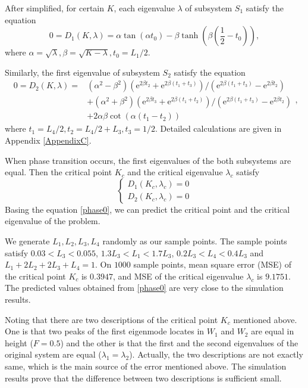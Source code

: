 \documentclass[a4paper,11pt]{article}
\begin{document}
After simplified, for certain $K$, each eigenvalue $\lambda$ of subsystem $S_1$ satisfy the equation
\begin{equation}\label{phase1}
0 = D_1(K, \lambda) = \alpha \tan(\alpha t_0) - \beta \tanh(\beta (\frac12 - t_0)),
\end{equation}
where $\alpha = \sqrt{\lambda}, \beta = \sqrt{K - \lambda}, t_0 = L_1 / 2$.

Similarly, the first eigenvalue of subsystem $S_2$ satisfy the equation
\begin{equation}\label{phase2}
\begin{split}
0 = D_2(K, \lambda) = & (\alpha^2 - \beta^2)(\mathrm{e}^{2 \beta t_2} + \mathrm{e}^{2 \beta (t_1+t_3)}) / (\mathrm{e}^{2 \beta (t_1+t_3)} - \mathrm{e}^{2 \beta t_2}) \\
& + (\alpha^2 + \beta^2)(\mathrm{e}^{2 \beta t_3} + \mathrm{e}^{2 \beta (t_1+t_2)}) / (\mathrm{e}^{2 \beta (t_1+t_3)} - \mathrm{e}^{2 \beta t_2}) \\
& + 2 \alpha \beta \cot(\alpha (t_1 - t_2))
\end{split},
\end{equation}
where $t_1 = L_4 / 2, t_2 = L_4 / 2 + L_3, t_3 = 1 / 2$. Detailed calculations are given in Appendix \ref{AppendixC}.

When phase transition occurs, the first eigenvalues of the both subsystems are equal. Then the critical point $K_c$ and the critical eigenvalue $\lambda_c$ satisfy
\begin{equation}\label{phase0}
\left\{
\begin{split}
D_1(K_c, \lambda_c) = 0 \\
D_2(K_c, \lambda_c) = 0
\end{split}
\right.
\end{equation}
Basing the equation \eqref{phase0}, we can predict the critical point and the critical eigenvalue of the problem.

We generate $L_1, L_2, L_3, L_4$ randomly as our sample points. The sample points satisfy $0.03 < L_3 < 0.055$, $1.3 L_3 < L_1 < 1.7 L_3$, $0.2 L_3 < L_4 < 0.4 L_3$ and $L_1 + 2 L_2 + 2 L_3 + L_4 = 1$. On $1000$ sample points, mean square error (MSE) of the critical point $K_c$ is $0.3947$, and MSE of the critical eigenvalue $\lambda_c$ is $9.1751$. The predicted values obtained from \eqref{phase0} are very close to the simulation results.

\begin{remark}
Noting that there are two descriptions of the critical point $K_c$ mentioned above. One is that two peaks of the first eigenmode locates in $W_1$ and $W_2$ are equal in height ($F = 0.5$) and the other is that the first and the second eigenvalues of the original system are equal ($\lambda_1 = \lambda_2$). Actually, the two descriptions are not exactly same, which is the main source of the error mentioned above. The simulation results prove that the difference between two descriptions is sufficient small.
\end{remark}
\end{document}

